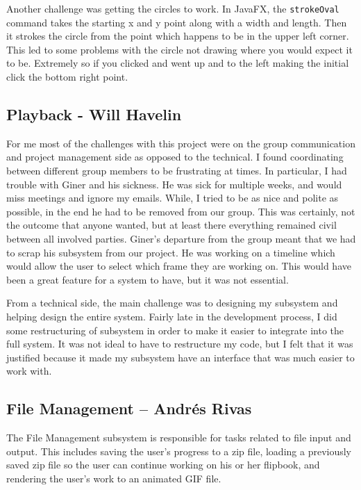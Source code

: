 \documentclass[10 pt]{scrartcl}
\begin{document}
Another challenge was getting the circles to work. In JavaFX, the \verb|strokeOval| command takes the starting x and y point along with a width and length. Then it strokes the circle from the point which happens to be in the upper left corner. This led to some problems with the circle not drawing where you would expect it to be. Extremely so if you clicked and went up and to the left making the initial click the bottom right point.

\subsection{Playback - Will Havelin}

For me most of the challenges with this project were on the group communication and project management side as opposed to the technical. I found coordinating between different group members to be frustrating at times. In particular, I had trouble with Giner and his sickness. He was sick for multiple weeks, and would miss meetings and ignore my emails. While, I tried to be as nice and polite as possible, in the end he had to be removed from our group. This was certainly, not the outcome that anyone wanted, but at least there everything remained civil between all involved parties. Giner's departure from the group meant that we had to scrap his subsystem from our project. He was working on a timeline which would allow the user to select which frame they are working on. This would have been a great feature for a system to have, but it was not essential. 

From a technical side, the main challenge was to designing my subsystem and helping design the entire system. Fairly late in the development process, I did some restructuring of subsystem in order to make it easier to integrate into the full system. It was not ideal to have to restructure my code, but I felt that it was justified because it made my subsystem have an interface that was much easier to work with.

\subsection{File Management -- Andr\'{e}s Rivas}

The File Management subsystem is responsible for tasks related to file input and output. This includes saving the user's progress to a zip file, loading a previously saved zip file so the user can continue working on his or her flipbook, and rendering the user's work to an animated GIF file.
\end{document}
